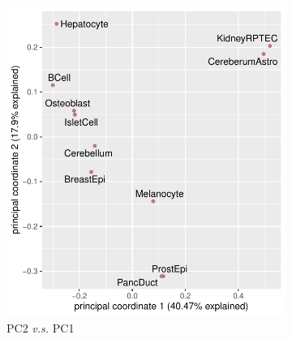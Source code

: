 
\begin{figure}[ht!]
  \begin{minipage}[c]{\textwidth}
    \begin{subfigure}{.5\textwidth}
    \centering
    \includegraphics[scale=0.7]{graphics/encode_pca_1_2.pdf}
    \caption{PC2 \textit{v.s.} PC1}
    \end{subfigure}
    ~
    \begin{subfigure}{.5\textwidth}
    \centering

\end{subfigure}
\end{minipage}
\end{figure}

